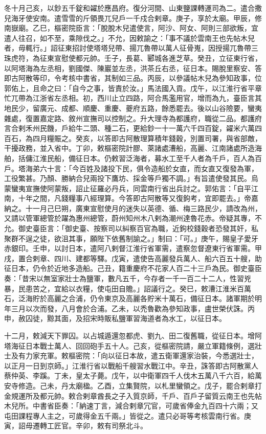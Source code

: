 \begin{pinyinscope}
 冬十月己亥，以鈔五千錠和糴於應昌府。復分河間、山東鹽課轉運司為二。遣合撒兒海牙使安南。遣雪雪的斤領畏兀兒戶一千戍合剌章。庚子，享於太廟。甲辰，修南嶽廟。乙巳，樞密院臣言：「脫脫木兒遣使言，阿沙、阿女、阿則三部欲叛，宜遣人往召，如不至，乘隙伐之。」不允，因敕諭之：「事不議於雲南王也先帖木兒者，毋輒行。」詔征東招討使塔塔兒帶、揚兀魯帶以萬人征骨嵬，因授揚兀魯帶三珠虎符，為征東宣慰使都元帥。壬子，長葛、郾城各進芝草。癸丑，立征東行省，以阿塔海為左丞相，劉國傑、陳巖並左丞，洪茶丘右丞，征日本。賜脫里察安、答即古阿散等印，令考核中書省，其制如三品。丙辰，以參議帖木兒為參知政事，位郭佑上，且命之曰：「自今之事，皆責於汝。」馬法國入貢。戊午，以江淮行省平章忙兀帶為江浙省左丞相。初，西川止立四路，阿合馬濫用官，增而為九，臺臣言其地民少，留廣元、成都、順慶、重慶、夔府五路，餘悉罷去。後以山谷險要，蠻夷雜處，復置嘉定路、敘州宣撫司以控制之。升大理寺為都護府，職從二品。都護府言合剌禾州民饑，戶給牛二頭、種二石，更給鈔一十一萬六千四百錠，糴米六萬四百石，為四月糧賑之。癸亥，以答即古阿散理算積年錢穀，別置司署，與省部敵，干擾政務，並入省中。丁卯，敕樞密院計膠、萊諸處漕船，高麗、江南諸處所造海舶，括傭江淮民船，備征日本。仍敕習泛海者，募水工至千人者為千戶，百人為百戶。塔海弟六十言：「今百姓及諸投下民，俱令造船於女直，而女直又復發為軍，工役繁甚。乃顏、勝納合兒兩投下鷹坊、採金等戶獨不調。」有旨遣使發其民。烏蒙蠻夷宣撫使阿蒙叛，詔止征羅必丹兵，同雲南行省出兵討之。郭佑言：「自平江南，十年之間，凡錢糧事八經理算。今答即古阿散等又復鉤考，宜即罷去。」帝嘉納之。十一月己巳朔，廣東宣慰使月的迷失以英德、循、梅三路民少，請改為州，又請以管軍總管於躍為惠州總管，蔚州知州木八剌為潮州達魯花赤。帝疑其專，不允。御史臺臣言：「御史臺、按察司以糾察百官為職，近鉤校錢穀者恐發其奸，私聚群不逞之徒，欲沮其事，願陛下依舊制諭之。」制曰：「可。」庚午，賜皇子愛牙赤銀印。壬申，以討日本，遣阿八剌督江淮行省軍需，遣察忽督遼東行省軍需。甲戌，置合剌章、四川、建都等驛。戊寅，遣使告高麗發兵萬人、船六百五十艘，助征日本，仍令於近地多造船。己丑，籍重慶府不花家人百二十三戶為民。御史臺臣奏：「昔宋以無室家壯士為鹽軍，數凡五千，今存者一千一百二十二人，性習兇暴，民患苦之，宜給以衣糧，使屯田自贍。」詔議行之。癸巳，敕漕江淮米百萬石，泛海貯於高麗之合浦，仍令東京及高麗各貯米十萬石，備征日本。諸軍期於明年三月以次而發，八月會於合浦。乙未，以禿魯歡為參知政事，盧世榮伏誅。丙申，赦囚徒，黥其面，及招宋時販私鹽軍習海道者為水工，以征日本。



 十二月，敕減天下罪囚。以占城遁還忽都虎、劉九、田二復舊職，從征日本。增阿塔海征日本戰士萬人、回回砲手五十人。己亥，從樞密院請，嚴立軍籍條例，選壯士及有力家充軍。敕樞密院：「向以征日本故，遣五衛軍還家治裝，今悉選壯士，以正月一日到京師。」江淮行省以戰船千艘習水戰江中。辛丑，誅答即古阿散黨人蔡仲英、李蹊。丁未，皇太子薨。戊午，以中衛軍四千人伐木五萬八千六百，給萬安寺修造。己未，丹太廟楹。乙酉，立集賢院，以札里蠻領之。戊子，罷合剌章打金規運所及都元帥。敕合剌章酋長之子入質京師，千戶、百戶子留質云南王也先帖木兒所。中書省臣奏：「納速丁言，減合剌章冗官，可歲省俸金九百四十六兩；又屯田課程專人主之，可歲得金五千兩。」皆從之。遣只必哥等考核雲南行省。庚寅，詔毋遷轉工匠官。辛卯，敕有司祭北斗。




\end{pinyinscope}
